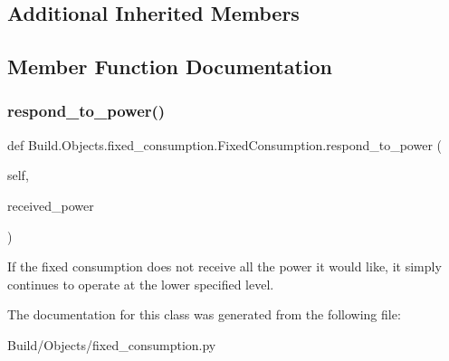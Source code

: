 \subsection*{Additional Inherited Members}


\subsection{Member Function Documentation}
\mbox{\label{class_build_1_1_objects_1_1fixed__consumption_1_1_fixed_consumption_adc5b45c93ea370e11aecc8f87e2eebbc}} 
\subsubsection{\texorpdfstring{respond\+\_\+to\+\_\+power()}{respond\_to\_power()}}
{\footnotesize\ttfamily def Build.\+Objects.\+fixed\+\_\+consumption.\+Fixed\+Consumption.\+respond\+\_\+to\+\_\+power (\begin{DoxyParamCaption}\item[{}]{self,  }\item[{}]{received\+\_\+power }\end{DoxyParamCaption})}



If the fixed consumption does not receive all the power it would like, it simply continues to operate at the lower specified level. 



The documentation for this class was generated from the following file\+:\begin{DoxyCompactItemize}
\item 
Build/\+Objects/fixed\+\_\+consumption.\+py\end{DoxyCompactItemize}
